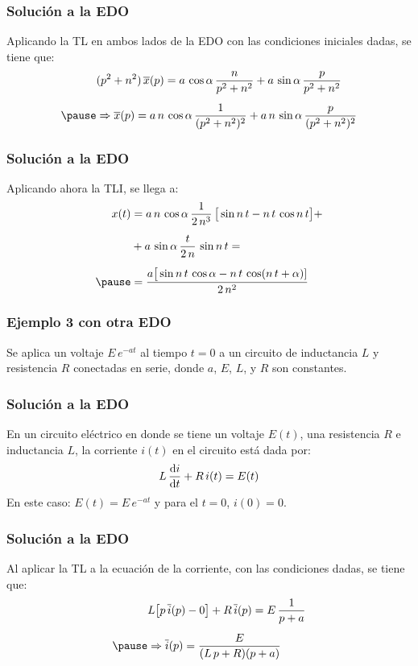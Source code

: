 \begin{frame}
\frametitle{Solución a la EDO}
Aplicando la TL en ambos lados de la EDO con las condiciones iniciales dadas, se tiene que:
\pause
\begin{eqnarray*}
\begin{aligned}
&(p^{2} + n^{2}) \, \overline{x}(p) = a \, \cos \alpha \, \dfrac{n}{p^{2} + n^{2}} +  a \, \sin \alpha \, \dfrac{p}{p^{2} + n^{2}} \\[0.5em] \pause
&\Rightarrow \overline{x}(p) = a \, n \, \cos \alpha \, \dfrac{1}{(p^{2} + n^{2})^{2}} + a \, n \, \sin \alpha \, \dfrac{p}{(p^{2} + n^{2})^{2}}
\end{aligned}
\end{eqnarray*}
\end{frame}
\begin{frame}
\frametitle{Solución a la EDO}
Aplicando ahora la TLI, se llega a:
\pause
\begin{eqnarray*}
\begin{aligned}
x (t) &= a \, n \, \cos \alpha \, \dfrac{1}{2 \, n^{3}} \, \big[ \sin n \, t - n \, t \, \cos n \, t  \big] + \\[0.5em] 
&+ a \, \sin \alpha \, \dfrac{t}{2 \, n} \, \sin n \, t = \\[0.5em] \pause
&= \dfrac{a \big[ \sin n \, t \, \cos \alpha - n \, t \, \cos (n \, t +  \alpha)]}{2 \, n^{2}}
\end{aligned}
\end{eqnarray*}
\end{frame}
\begin{frame}
\frametitle{Ejemplo 3 con otra EDO}
Se aplica un voltaje $E \, e^{- a t}$ al tiempo $t = 0$ a un circuito de inductancia $L$ y resistencia $R$ conectadas en serie, donde $a$, $E$, $L$, y $R$ son constantes.
\\
\bigskip
\pause
{}
\end{frame}
\begin{frame}
\frametitle{Solución a la EDO}
En un circuito eléctrico en donde se tiene un voltaje $E(t)$, una resistencia $R$ e inductancia $L$, la corriente $i(t)$ en el circuito está dada por:
\pause
\begin{align*}
L \, \dv{i}{t} + R \, i(t) =  E(t)
\end{align*}
\pause
En este caso: $E(t) = E \, e^{-a t}$ y para el $t = 0$, $i(0) = 0$.
\end{frame}
\begin{frame}
\frametitle{Solución a la EDO}
Al aplicar la TL a la ecuación de la corriente, con las condiciones dadas, se tiene que:
\pause
\begin{eqnarray*}
\begin{aligned}
&L \big[  p \, \overline{i}(p) - 0  \big] + R \, \overline{i} (p) = E \, \dfrac{1}{p + a} \\[0.5em] \pause
&\Rightarrow \overline{i}(p) = \dfrac{E}{(L \, p + R)(p + a)} 
\end{aligned}
\end{eqnarray*}
\end{frame}
